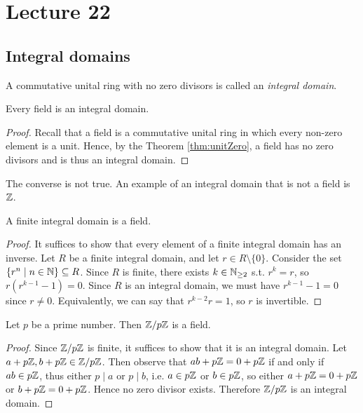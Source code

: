 \section{Lecture 22}
\subsection{Integral domains}
\begin{definition}
  A commutative unital ring with no zero divisors is called an \emph{integral domain}.
  \label{def:integralDomain}
\end{definition}

\begin{corollary}
  Every field is an integral domain.
  \label{<+label+>}
\end{corollary}
\begin{proof}
  Recall that a field is a commutative unital ring in which every non-zero element is a unit. Hence, by the Theorem \ref{thm:unitZero}, a field has no zero divisors and is thus an integral domain.
\end{proof}
\begin{remark}
  The converse is not true. An example of an integral domain that is not a field is
  $\mathbb Z$.
  \label{<+label+>}
\end{remark}

\begin{theorem}
  A finite integral domain is a field.
\end{theorem}
\begin{proof}
  It suffices to show that every element of a finite integral
  domain has an inverse. Let $R$ be a finite integral domain, and let $r\in R\setminus\{0\}$. Consider the set $\{r^n \mid n\in\mathbb N\}\subseteq R$. Since $R$ is
  finite, there exists $k\in\mathbb N_{\geq 2}$ s.t. $r^k=r$, so $r(r^{k-1}-1)=0$. Since
  $R$ is an integral domain, we must have $r^{k-1}-1 = 0$ since $r \neq 0.$ Equivalently, we can say that $r^{k-2}r=1$, so $r$ is invertible.
  \end{proof}

\begin{corollary}
  Let $p$ be a prime number. Then $\mathbb Z/p\mathbb Z$ is a field.
  \label{<+label+>}
\end{corollary}
\begin{proof}
  Since $\mathbb Z/p\mathbb Z$ is finite, it suffices to show that it is an integral domain. Let
  $a+p\mathbb Z, b+p\mathbb Z\in \mathbb Z/p\mathbb Z$. Then observe that $ab+p\mathbb Z=0+p\mathbb Z$ if and only if $ab\in
  p\mathbb Z$, thus either $p \mid a $ or $p \mid b$, i.e. $a \in p\mathbb Z$ or $b \in p\mathbb Z$, so either $a+p\mathbb Z = 0 + p\mathbb Z$ or $b+p\mathbb Z = 0 +p\mathbb Z $.
  Hence no zero divisor exists. Therefore $\mathbb Z/p\mathbb Z$ is an integral
  domain.
\end{proof}

